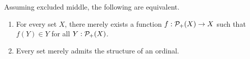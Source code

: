 \documentclass[hott-all.tex]{subfiles}
\begin{document}
% 
% 
% 
% 
\begin{thm}
  Assuming excluded middle, the following are equivalent.
  \begin{enumerate}
  \item For every set $X$, there merely exists a function
    $ f: \mathcal{P}_+(X) \to X $
    such that $f(Y)\in Y$ for all $Y:\mathcal{P}_+(X)$.
  \item Every set merely admits the structure of an ordinal.
  \end{enumerate}
\end{thm}
% 
\end{document}
